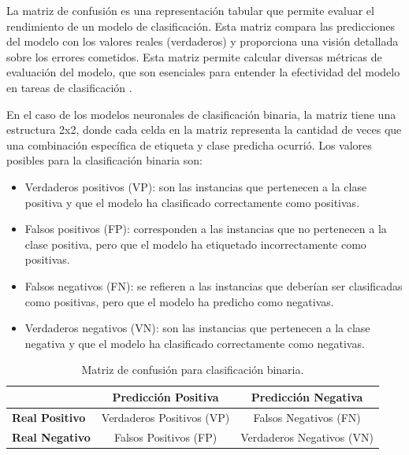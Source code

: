 La matriz de confusión es una representación tabular que permite evaluar el rendimiento de un modelo de clasificación. Esta matriz compara las predicciones del modelo con los valores reales (verdaderos) y proporciona una visión detallada sobre los errores cometidos. Esta matriz permite calcular diversas métricas de evaluación del modelo, que son esenciales para entender la efectividad del modelo en tareas de clasificación \cite{han2011data}.

En el caso de los modelos neuronales de clasificación binaria, la matriz tiene una estructura 2x2, donde cada celda en la matriz representa la cantidad de veces que una combinación específica de etiqueta y clase predicha ocurrió. Los valores posibles para la clasificación binaria son: 

\begin{itemize}

	\item Verdaderos positivos (VP): son las instancias que pertenecen a la clase positiva y que el modelo ha clasificado correctamente como positivas.

    \item Falsos positivos (FP): corresponden a las instancias que no pertenecen a la clase positiva, pero que el modelo ha etiquetado incorrectamente como positivas.

    \item Falsos negativos (FN): se refieren a las instancias que deberían ser clasificadas como positivas, pero que el modelo ha predicho como negativas.

    \item Verdaderos negativos (VN): son las instancias que pertenecen a la clase negativa y que el modelo ha clasificado correctamente como negativas.

\end{itemize}



\begin{table}[h]
\centering
\label{tab:confusion_matrix}
\begin{tabular}{|l|c|c|}
\hline
 & \textbf{Predicción Positiva} & \textbf{Predicción Negativa} \\ \hline
\textbf{Real Positivo} & Verdaderos Positivos (VP) & Falsos Negativos (FN) \\ \hline
\textbf{Real Negativo} & Falsos Positivos (FP) & Verdaderos Negativos (VN) \\ \hline
\end{tabular}
\caption{Matriz de confusión para clasificación binaria.}
\end{table}

